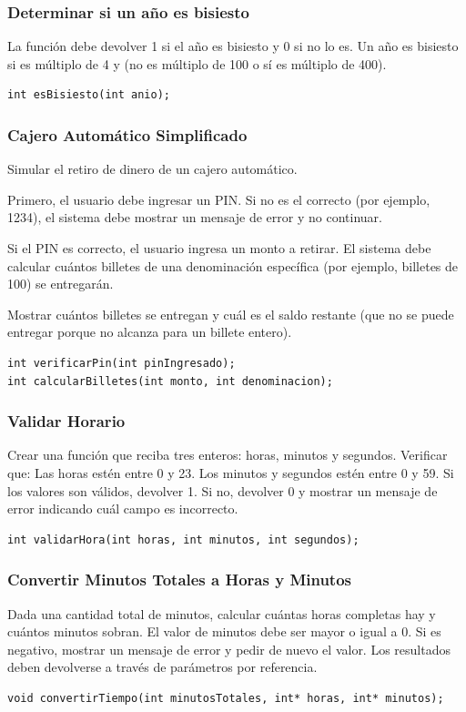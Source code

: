 \subsubsection{Determinar si un año es bisiesto}
La función debe devolver 1 si el año es bisiesto y 0 si no lo es. Un año es bisiesto si es múltiplo de 4 y (no es múltiplo de 100 o sí es múltiplo de 400).
\begin{lstlisting}[style=customc, basicstyle=\ttfamily]
int esBisiesto(int anio);
\end{lstlisting}


\subsubsection{Cajero Automático Simplificado}
Simular el retiro de dinero de un cajero automático.

Primero, el usuario debe ingresar un PIN. Si no es el correcto (por ejemplo, 1234), el sistema debe mostrar un mensaje de error y no continuar.

Si el PIN es correcto, el usuario ingresa un monto a retirar. El sistema debe calcular cuántos billetes de una denominación específica (por ejemplo, billetes de 100) se entregarán.

Mostrar cuántos billetes se entregan y cuál es el saldo restante (que no se puede entregar porque no alcanza para un billete entero).
\begin{lstlisting}[style=customc, basicstyle=\ttfamily]
int verificarPin(int pinIngresado);
int calcularBilletes(int monto, int denominacion);
\end{lstlisting}


\subsubsection{Validar Horario}
Crear una función que reciba tres enteros: horas, minutos y segundos. Verificar que:
Las horas estén entre 0 y 23.
Los minutos y segundos estén entre 0 y 59.
Si los valores son válidos, devolver 1. Si no, devolver 0 y mostrar un mensaje de error indicando cuál campo es incorrecto.
\begin{lstlisting}[style=customc, basicstyle=\ttfamily]
int validarHora(int horas, int minutos, int segundos); 
\end{lstlisting}

\subsubsection{Convertir Minutos Totales a Horas y Minutos}
Dada una cantidad total de minutos, calcular cuántas horas completas hay y cuántos minutos sobran.
El valor de minutos debe ser mayor o igual a 0. Si es negativo, mostrar un mensaje de error y pedir de nuevo el valor.
Los resultados deben devolverse a través de parámetros por referencia.
\begin{lstlisting}[style=customc, basicstyle=\ttfamily]
void convertirTiempo(int minutosTotales, int* horas, int* minutos);
\end{lstlisting}

